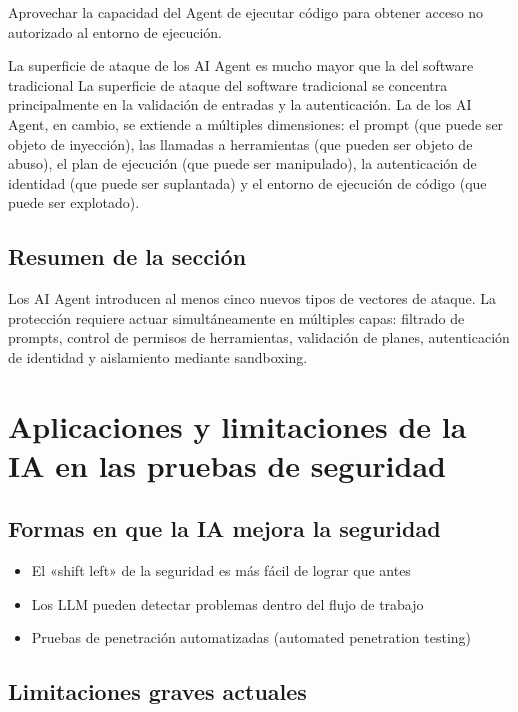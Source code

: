 \documentclass[a4paper]{article}
\begin{document}
Aprovechar la capacidad del Agent de ejecutar código para obtener acceso no autorizado al entorno de ejecución.

\begin{warningbox}{La superficie de ataque de los AI Agent es mucho mayor que la del software tradicional}
La superficie de ataque del software tradicional se concentra principalmente en la validación de entradas y la autenticación. La de los AI Agent, en cambio, se extiende a múltiples dimensiones: el prompt (que puede ser objeto de inyección), las llamadas a herramientas (que pueden ser objeto de abuso), el plan de ejecución (que puede ser manipulado), la autenticación de identidad (que puede ser suplantada) y el entorno de ejecución de código (que puede ser explotado).
\end{warningbox}

\subsection{Resumen de la sección}

Los AI Agent introducen al menos cinco nuevos tipos de vectores de ataque. La protección requiere actuar simultáneamente en múltiples capas: filtrado de prompts, control de permisos de herramientas, validación de planes, autenticación de identidad y aislamiento mediante sandboxing.

\section{Aplicaciones y limitaciones de la IA en las pruebas de seguridad}

\subsection{Formas en que la IA mejora la seguridad}

\begin{itemize}
    \item El «shift left» de la seguridad es más fácil de lograr que antes
    \item Los LLM pueden detectar problemas dentro del flujo de trabajo
    \item Pruebas de penetración automatizadas (automated penetration testing)
\end{itemize}

\subsection{Limitaciones graves actuales}
\end{document}
